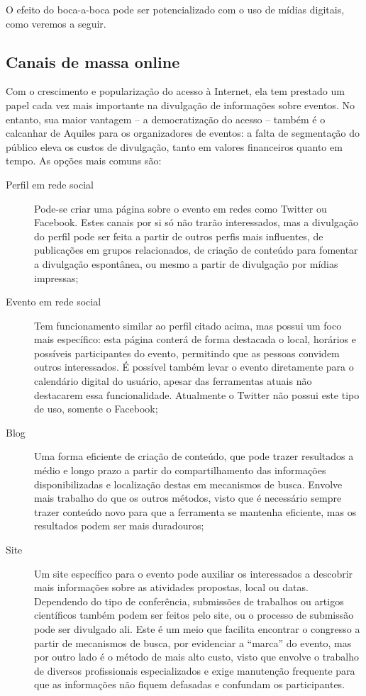 \documentclass[12pt,a4paper,twoside,hyphens,english,brazil]{abntex2}
\begin{document}
O efeito do boca-a-boca pode ser potencializado com o uso de mídias digitais, como veremos a seguir.

\subsection*{Canais de massa online}
Com o crescimento e popularização do acesso à Internet, ela tem prestado um papel cada vez mais importante na divulgação de informações sobre eventos. No entanto, sua maior vantagem -- a democratização do acesso -- também é o calcanhar de Aquiles para os organizadores de eventos: a falta de segmentação do público eleva os custos de divulgação, tanto em valores financeiros quanto em tempo. As opções mais comuns são:
\begin{description}
	\item[Perfil em rede social] Pode-se criar uma página sobre o evento em redes como Twitter ou Facebook. Estes canais por si só não trarão interessados, mas a divulgação do perfil pode ser feita a partir de outros perfis mais influentes, de publicações em grupos relacionados, de criação de conteúdo para fomentar a divulgação espontânea, ou mesmo a partir de divulgação por mídias impressas;
	\item[Evento em rede social] Tem funcionamento similar ao perfil citado acima, mas possui um foco mais específico: esta página conterá de forma destacada o local, horários e possíveis participantes do evento, permitindo que as pessoas convidem outros interessados. É possível também levar o evento diretamente para o calendário digital do usuário, apesar das ferramentas atuais não destacarem essa funcionalidade. Atualmente o Twitter não possui este tipo de uso, somente o Facebook;
	\item[Blog] Uma forma eficiente de criação de conteúdo, que pode trazer resultados a médio e longo prazo a partir do compartilhamento das informações disponibilizadas e localização destas em mecanismos de busca. Envolve mais trabalho do que os outros métodos, visto que é necessário sempre trazer conteúdo novo para que a ferramenta se mantenha eficiente, mas os resultados podem ser mais duradouros;
	\item[Site] Um site específico para o evento pode auxiliar os interessados a descobrir mais informações sobre as atividades propostas, local ou datas. Dependendo do tipo de conferência, submissões de trabalhos ou artigos científicos também podem ser feitos pelo site, ou o processo de submissão pode ser divulgado ali. Este é um meio que facilita encontrar o congresso a partir de mecanismos de busca, por evidenciar a ``marca'' do evento, mas por outro lado é o método de mais alto custo, visto que envolve o trabalho de diversos profissionais especializados e exige manutenção frequente para que as informações não fiquem defasadas e confundam os participantes.
\end{description}
\end{document}

